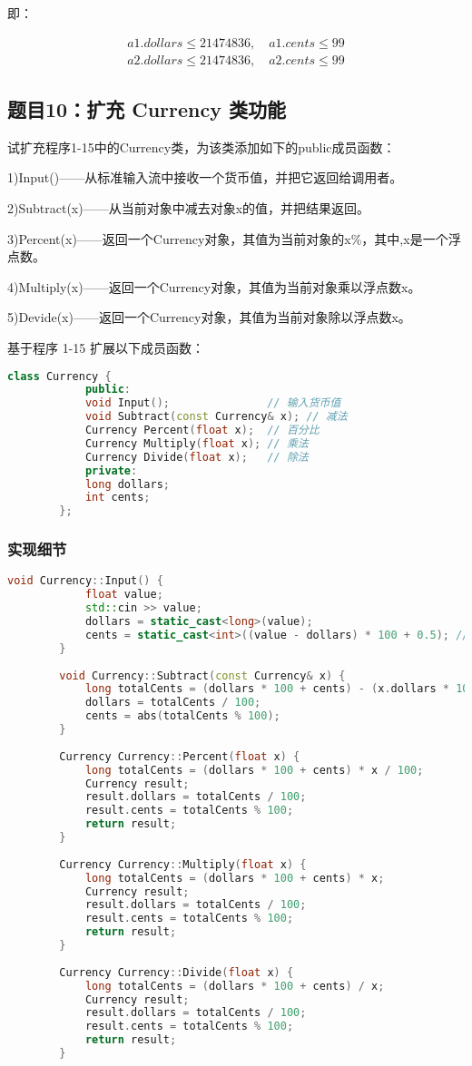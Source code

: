 \documentclass[UTF8]{ctexart}
\begin{document}
	即：
	
	\begin{align}
	a1.dollars \leq 21474836,\quad a1.cents \leq 99 \\
	a2.dollars \leq 21474836,\quad a2.cents \leq 99
\end{align}
	
	
	
	\subsection{题目10：扩充 Currency 类功能}
	试扩充程序1-15中的Currency类，为该类添加如下的public成员函数：
	
	1)Input()——从标准输入流中接收一个货币值，并把它返回给调用者。
	
	2)Subtract(x)——从当前对象中减去对象x的值，并把结果返回。
	
	3)Percent(x)——返回一个Currency对象，其值为当前对象的x\%，其中,x是一个浮点数。
	
	4)Multiply(x)——返回一个Currency对象，其值为当前对象乘以浮点数x。
	
	5)Devide(x)——返回一个Currency对象，其值为当前对象除以浮点数x。
	
	基于程序 1-15 扩展以下成员函数：
	
	\begin{lstlisting}[language=C++]
		class Currency {
			public:
			void Input();               // 输入货币值
			void Subtract(const Currency& x); // 减法
			Currency Percent(float x);  // 百分比
			Currency Multiply(float x); // 乘法
			Currency Divide(float x);   // 除法
			private:
			long dollars;
			int cents;
		};
	\end{lstlisting}
	
	\subsubsection{实现细节}
	\begin{lstlisting}[language=C++]
		void Currency::Input() {
			float value;
			std::cin >> value;
			dollars = static_cast<long>(value);
			cents = static_cast<int>((value - dollars) * 100 + 0.5); // 四舍五入
		}
		
		void Currency::Subtract(const Currency& x) {
			long totalCents = (dollars * 100 + cents) - (x.dollars * 100 + x.cents);
			dollars = totalCents / 100;
			cents = abs(totalCents % 100);
		}
		
		Currency Currency::Percent(float x) {
			long totalCents = (dollars * 100 + cents) * x / 100;
			Currency result;
			result.dollars = totalCents / 100;
			result.cents = totalCents % 100;
			return result;
		}
		
		Currency Currency::Multiply(float x) {
			long totalCents = (dollars * 100 + cents) * x;
			Currency result;
			result.dollars = totalCents / 100;
			result.cents = totalCents % 100;
			return result;
		}
		
		Currency Currency::Divide(float x) {
			long totalCents = (dollars * 100 + cents) / x;
			Currency result;
			result.dollars = totalCents / 100;
			result.cents = totalCents % 100;
			return result;
		}
	\end{lstlisting}
\end{document}
